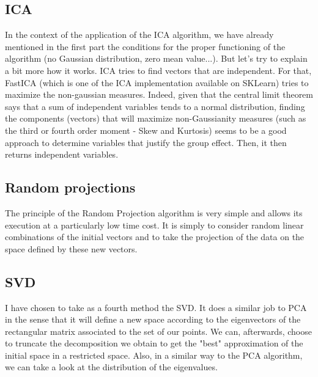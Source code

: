 \documentclass[15pt]{article}
\begin{document}
\begin{multicols}{2}
\subsection{ICA}

In the context of the application of the ICA algorithm, we have already mentioned in the first part the conditions for the proper functioning of the algorithm (no Gaussian distribution, zero mean value...). But let's try to explain a bit more how it works. ICA tries to find vectors that are independent. For that, FastICA (which is one of the ICA implementation available on SKLearn) tries to maximize the non-gaussian measures. Indeed, given that the central limit theorem says that a sum of independent variables tends to a normal distribution, finding the components (vectors) that will maximize non-Gaussianity measures (such as the third or fourth order moment - Skew and Kurtosis) seems to be a good approach to determine variables that justify the group effect. Then, it then returns independent variables.

\subsection{Random projections}

The principle of the Random Projection algorithm is very simple and allows its execution at a particularly low time cost. It is simply to consider random linear combinations of the initial vectors and to take the projection of the data on the space defined by these new vectors. 

\subsection{SVD}

I have chosen to take as a fourth method the SVD. It does a similar job to PCA in the sense that it will define a new space according to the eigenvectors of the rectangular matrix associated to the set of our points. We can, afterwards, choose to truncate the decomposition we obtain to get the "best" approximation of the initial space in a restricted space. Also, in a similar way to the PCA algorithm, we can take a look at the distribution of the eigenvalues.


\end{multicols}
\end{document}
